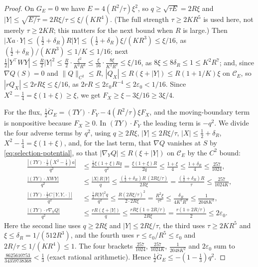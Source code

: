 \begin{proof}
On $G_E=0$ we have $E=4(R^2/\tau)\xi^2$, so $q\ge\sqrt{\tau E}=2R\xi$ and $|Y|\le\sqrt{E/\tau}=2R\xi/\tau\le\xi/(KR^4)$. (The full strength $\tau\ge2KR^5$ is used here, not merely $\tau\ge2KR$; this matters for the next bound when $R$ is large.) Then $|Xa\cdot Y|\le(\frac12+\delta_R)R|Y|\le(\frac12+\delta_R)\xi/(KR^3)\le\xi/16$, as $(\frac12+\delta_R)/(KR^3)\le1/K\le1/16$; next $\frac12|Y^{\top}WY|\le\frac R2|Y|^2\le\frac R2\cdot\frac{\xi^2}{K^2R^8}\le\frac\xi{16}\cdot\frac{8\xi}{K^2R^7}\le\xi/16$, as $8\xi\le8\delta_R\le1\le K^2R^7$; and, since $\nabla Q(S)=0$ and $\|Q\|_{C^2}\le R$, $|Q_X|\le R(\xi+|Y|)\le R(1+1/K)\xi$ on $\mathcal C_E$, so $|rQ_X|\le2rR\xi\le\xi/16$, as $2rR\le2\varepsilon_0R^{-4}\le2\varepsilon_0<1/16$. Since $X^2-\frac14=\xi(1+\xi)\ge\xi$, we get $F_X\ge\xi-3\xi/16\ge3\xi/4$.

For the flux, $\frac12\dot G_E=(TY)\cdot F_Y-4(R^2/\tau)\xi F_X$, and the moving-boundary term is nonpositive because $F_X\ge0$. In $(TY)\cdot F_Y$ the leading term is $-q^2$. We divide the four adverse terms by $q^2$, using $q\ge2R\xi$, $|Y|\le2R\xi/\tau$, $|X|\le\frac12+\delta_R$, $X^2-\frac14=\xi(1+\xi)$, and, for the last term, that $\nabla Q$ vanishes at $S$ by \eqref{eq:selection-potential}, so that $|\nabla_YQ|\le R(\xi+|Y|)$ on $\mathcal C_E$ by the $C^2$ bound:
\begin{equation}\label{eq:selection-coneledger}
\begin{aligned}
\frac{|(TY)\cdot\frac12(X^2-\frac14)a|}{q^2}&\le\frac{\frac12\xi(1+\xi)Rq}{q^2}=\frac{\xi(1+\xi)R}{2q}\le\frac{1+\xi}4\le\frac{1+\delta_R}4\le\frac{257}{1024},\\
\frac{|(TY)\cdot XWY|}{q^2}&\le\frac{|X|\,R\,|Y|}q\le\frac{(\frac12+\delta_R)R\,(2R\xi/\tau)}{2R\xi}=\frac{(\frac12+\delta_R)R}\tau\le\frac{257}{1024K},\\
\frac{|(TY)\cdot\frac12C[Y,Y,\cdot\,]|}{q^2}&\le\frac{\frac12R|Y|^2q}{q^2}\le\frac{R(2R\xi/\tau)^2}{2\cdot2R\xi}=\frac{R^2\xi}{\tau^2}\le\frac{\delta_R}{4K^2R^8}\le\frac1{2048K^2},\\
\frac{|(TY)\cdot r\nabla_YQ|}{q^2}&\le\frac{rR(\xi+|Y|)}q\le\frac{rR\xi(1+2R/\tau)}{2R\xi}=\frac{r(1+2R/\tau)}2\le2\varepsilon_0 .
\end{aligned}
\end{equation}
Here the second line uses $q\ge2R\xi$ and $|Y|\le2R\xi/\tau$, the third uses $\tau\ge2KR^5$ and $\xi\le\delta_R=1/(512R^3)$, and the fourth uses $r\le\varepsilon_0/R^5\le\varepsilon_0$ and $2R/\tau\le1/(KR^4)\le1$. The four brackets $\frac{257}{1024}$, $\frac{257}{1024K}$, $\frac1{2048K^2}$ and $2\varepsilon_0$ sum to $\frac{8625610753}{34359738368}<\frac13$ (exact rational arithmetic). Hence $\frac12\dot G_E\le-(1-\frac13)q^2$.
\end{proof}


